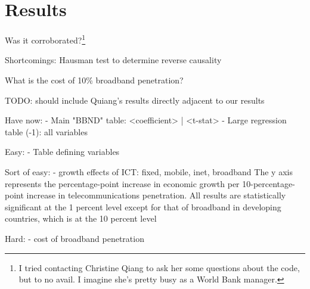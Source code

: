\section{Results}
\label{sec:results}

Was it corroborated?\footnote{I tried contacting Christine Qiang to ask
her some questions about the code, but to no avail. I imagine she's pretty
busy as a World Bank manager.}

Shortcomings: Hausman test to determine reverse causality

What is the cost of 10\% broadband penetration?

TODO: should include Quiang's results directly adjacent to our results

Have now:
  - Main "BBND" table: <coefficient> | <t-stat>
  - Large regression table (-1): all variables

Easy:
  - Table defining variables


Sort of easy:
  - growth effects of ICT: fixed, mobile, inet, broadband
    The y axis represents the percentage-point increase in economic growth per
    10-percentage-point increase in telecommunications penetration. All
    results are statistically significant at the 1 percent level except for
    that of broadband in developing countries, which is at the 10 percent
    level

Hard:
   - cost of broadband penetration

